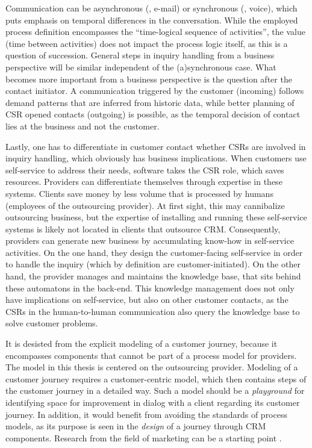 	Communication can be asynchronous (\eg, e-mail) or synchronous (\eg, voice), which puts emphasis on temporal differences in the conversation. While the employed process definition encompasses the \enquote{time-logical sequence of activities}, the value (\viz time between activities) does not impact the process logic itself, as this is a question of succession. General steps in inquiry handling from a business perspective will be similar independent of the (a)synchronous case. What becomes more important from a business perspective is the question after the contact initiator. A communication triggered by the customer (incoming) follows demand patterns that are inferred from historic data, while better planning of \acrshort{CSR} opened contacts (outgoing) is possible, as the temporal decision of contact lies at the business and not the customer. 
	
	Lastly, one has to differentiate in customer contact whether \acrshort{CSR}s are involved in inquiry handling, which obviously has business implications. When customers use self-service to address their needs, software takes the \acrshort{CSR} role, which saves resources. Providers can differentiate themselves through expertise in these systems. Clients save money by less volume that is processed by humans (employees of the outsourcing provider). At first sight, this may cannibalize outsourcing business, but the expertise of installing and running these self-service systems is likely not located in clients that outsource \acrshort{CRM}. Consequently, providers can generate new business by accumulating know-how in self-service activities. On the one hand, they design the customer-facing self-service in order to handle the inquiry (which by definition are customer-initiated). On the other hand, the provider manages and maintains the knowledge base, that sits behind these automatons in the back-end. This knowledge management does not only have implications on self-service, but also on other customer contacts, as the \acrshort{CSR}s in the human-to-human communication also query the knowledge base to solve customer problems.  
	
	It is desisted from the explicit modeling of a customer journey, because it encompasses components that cannot be part of a process model for providers. The model in this thesis is centered on the outsourcing provider. Modeling of a customer journey requires a customer-centric model, which then contains steps of the customer journey in a detailed way. Such a model should be a \textit{playground} for identifying space for improvement in dialog with a client regarding its customer journey. In addition, it would benefit from avoiding the standards of process models, as its purpose is seen in the \textit{design} of a journey through \acrshort{CRM} components. Research from the field of marketing can be a starting point \citep{Lemon_2016, Frow_2007}. 
	
